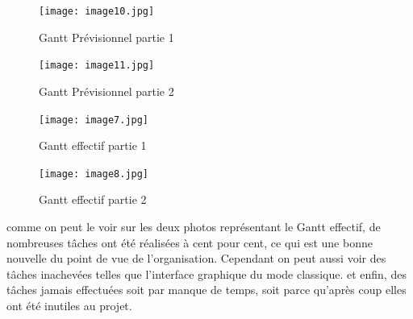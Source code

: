 \documentclass[a4paper,11pt]{article}
\begin{document}
\begin{figure}[ht!]
\centering
\texttt{[image: image10.jpg]} 
\caption {\label{image10} Gantt Prévisionnel partie 1}
\end{figure}
 \smallbreak
\begin{figure}[ht!]
\centering
\texttt{[image: image11.jpg]} 
\caption {\label{image11} Gantt Prévisionnel partie 2}
\end{figure}
 \smallbreak
\begin{figure}[ht!]
\centering
\texttt{[image: image7.jpg]} 
\caption {\label{image12} Gantt effectif partie 1}
\end{figure}
 \smallbreak
\begin{figure}[ht!]
\centering
\texttt{[image: image8.jpg]} 
\caption {\label{image13} Gantt effectif partie 2}
\end{figure}
 \smallbreak
comme on peut le voir sur les deux photos représentant le Gantt effectif, 
de nombreuses tâches ont été réalisées à cent pour cent, ce qui est une bonne nouvelle
du point de vue de l'organisation. Cependant on peut aussi voir des tâches inachevées telles que l'interface graphique du mode classique.
et enfin, des tâches jamais effectuées soit par manque de temps, soit parce qu'après coup elles ont été
inutiles au projet.
\end{document}
